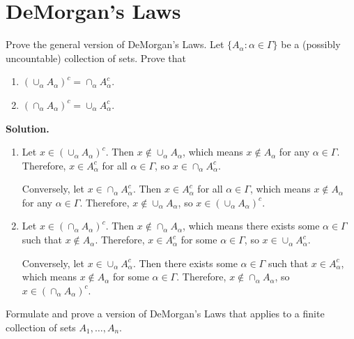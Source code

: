 \section{DeMorgan's Laws}

\begin{problembox}
Prove the general version of DeMorgan's Laws. Let $\{A_\alpha : \alpha \in \Gamma\}$ be a (possibly uncountable) collection of sets. Prove that
\begin{enumerate}[label=(\alph*)]
    \item $( \cup_{\alpha} A_\alpha )^c = \cap_{\alpha} A_\alpha^c$.
    \item $( \cap_{\alpha} A_\alpha )^c = \cup_{\alpha} A_\alpha^c$.
\end{enumerate}
\end{problembox}

\noindent\textbf{Solution.}
\begin{enumerate}[label=(\alph*)]
    \item Let $x \in (\cup_{\alpha} A_\alpha)^c$. Then $x \notin \cup_{\alpha} A_\alpha$, which means $x \notin A_\alpha$ for any $\alpha \in \Gamma$. Therefore, $x \in A_\alpha^c$ for all $\alpha \in \Gamma$, so $x \in \cap_{\alpha} A_\alpha^c$.
    
    Conversely, let $x \in \cap_{\alpha} A_\alpha^c$. Then $x \in A_\alpha^c$ for all $\alpha \in \Gamma$, which means $x \notin A_\alpha$ for any $\alpha \in \Gamma$. Therefore, $x \notin \cup_{\alpha} A_\alpha$, so $x \in (\cup_{\alpha} A_\alpha)^c$.
    
    \item Let $x \in (\cap_{\alpha} A_\alpha)^c$. Then $x \notin \cap_{\alpha} A_\alpha$, which means there exists some $\alpha \in \Gamma$ such that $x \notin A_\alpha$. Therefore, $x \in A_\alpha^c$ for some $\alpha \in \Gamma$, so $x \in \cup_{\alpha} A_\alpha^c$.
    
    Conversely, let $x \in \cup_{\alpha} A_\alpha^c$. Then there exists some $\alpha \in \Gamma$ such that $x \in A_\alpha^c$, which means $x \notin A_\alpha$ for some $\alpha \in \Gamma$. Therefore, $x \notin \cap_{\alpha} A_\alpha$, so $x \in (\cap_{\alpha} A_\alpha)^c$.
\end{enumerate}


\begin{problembox}
Formulate and prove a version of DeMorgan's Laws that applies to a finite collection of sets $A_1, \ldots, A_n$.
\end{problembox}

